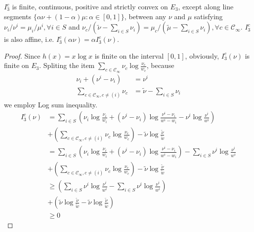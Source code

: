 \documentclass[11pt,en,cite=authoryear]{elegantpaper}
\begin{document}
\begin{corollary}
    $I_3^c$ is finite, continuous, positive and strictly convex on $E_3$, except along line segments $\{\alpha \nu + (1-\alpha) \mu: \alpha \in [0,1]\}$, between any $\nu$ and $\mu$ satisfying $\nu_i/\nu^i = \mu_i/\mu^i, \forall i \in S$ and $\nu_c/(\tilde{\nu}-\sum_{i\in S} \nu_i) =\mu_c/(\tilde{\mu}-\sum_{i\in S} \nu_i), \forall c \in \mathcal{C}_{\infty}$. $I_3^c$ is also affine, i.e. $I_3^c(\alpha \nu) = \alpha I_3^c( \nu)$.
\end{corollary}
\begin{proof}
    Since $h(x) = x \log x$ is finite on the interval $[0, 1]$, obviously, $I^c_3(\nu)$ is finite on $E_3$.
    Spliting the item $\sum_{c \in \mathcal{C}_{\infty}} \nu_{c} \log \frac{\nu_{c}}{w_c}$, because
    \begin{align*}
        \nu_i + (\nu^i - \nu_i) &= \nu^i \\
        \sum_{c\in \mathcal{C}_{\infty}, c\neq (i)} \nu_c &= \tilde{\nu} - \sum_{i\in S} \nu_i
    \end{align*}
    we employ Log sum inequality.
    \begin{align*}
        I^c_3(\nu) 
        &= \sum_{i\in S} \left(\nu_{i}\log \frac{\nu_{i}}{w_i} + (\nu^i - \nu_i)\log \frac{\nu^i - \nu_i}{w^i - w_i} 
        - \nu^i \log \frac{\nu^i}{w^i} \right)\\
        &+ \left(\sum_{c \in \mathcal{C}_{\infty}, c\neq (i)} \nu_{c} \log \frac{\nu_{c}}{w_c} \right)
        -\tilde{\nu}\log \frac{\tilde{\nu} }{\tilde{w} }\\
        &= \sum_{i\in S} \left(\nu_{i}\log \frac{\nu_{i}}{w_i} 
        + (\nu^i - \nu_i)\log \frac{\nu^i - \nu_i}{w^i - w_i} \right)
        - \sum_{i\in S} \nu^i \log \frac{\nu^i}{w^i} \\
        &+ \left(\sum_{c \in \mathcal{C}_{\infty}, c\neq (i)} \nu_{c} \log \frac{\nu_{c}}{w_c} \right)
        -\tilde{\nu}\log \frac{\tilde{\nu} }{\tilde{w} } \\ 
        &\ge \left(\sum_{i\in S} \nu^i \log \frac{\nu^i}{w^i}  
        - \sum_{i\in S} \nu^i \log \frac{\nu^i}{w^i} \right)\\
        &+ \left( \tilde{\nu}\log \frac{\tilde{\nu} }{\tilde{w} } 
        -\tilde{\nu}\log \frac{\tilde{\nu} }{\tilde{w} } \right)\\
        &\ge 0
    \end{align*}


\end{proof}
\end{document}
